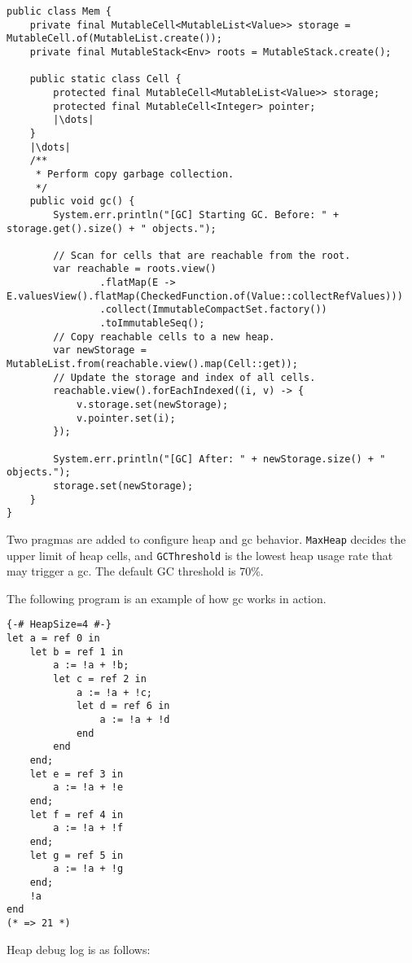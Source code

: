 \documentclass[a4paper]{article}
\begin{document}
\begin{verbatim}
public class Mem {
    private final MutableCell<MutableList<Value>> storage = MutableCell.of(MutableList.create());
    private final MutableStack<Env> roots = MutableStack.create();

    public static class Cell {
        protected final MutableCell<MutableList<Value>> storage;
        protected final MutableCell<Integer> pointer;
        |\dots|
    }
    |\dots|
    /**
     * Perform copy garbage collection.
     */
    public void gc() {
        System.err.println("[GC] Starting GC. Before: " + storage.get().size() + " objects.");

        // Scan for cells that are reachable from the root.
        var reachable = roots.view()
                .flatMap(E -> E.valuesView().flatMap(CheckedFunction.of(Value::collectRefValues)))
                .collect(ImmutableCompactSet.factory())
                .toImmutableSeq();
        // Copy reachable cells to a new heap.
        var newStorage = MutableList.from(reachable.view().map(Cell::get));
        // Update the storage and index of all cells.
        reachable.view().forEachIndexed((i, v) -> {
            v.storage.set(newStorage);
            v.pointer.set(i);
        });

        System.err.println("[GC] After: " + newStorage.size() + " objects.");
        storage.set(newStorage);
    }
}
\end{verbatim}

Two pragmas are added to configure heap and gc behavior. \texttt{MaxHeap} decides the upper limit of heap cells, and \texttt{GCThreshold} is the lowest heap usage rate that may trigger a gc. The default GC threshold is 70\%.

The following program is an example of how gc works in action.

\begin{verbatim}
{-# HeapSize=4 #-}
let a = ref 0 in
    let b = ref 1 in
        a := !a + !b;
        let c = ref 2 in
            a := !a + !c;
            let d = ref 6 in
                a := !a + !d
            end
        end
    end;
    let e = ref 3 in
        a := !a + !e
    end;
    let f = ref 4 in
        a := !a + !f
    end;
    let g = ref 5 in
        a := !a + !g
    end;
    !a
end
(* => 21 *)
\end{verbatim}

Heap debug log is as follows:
\end{document}
